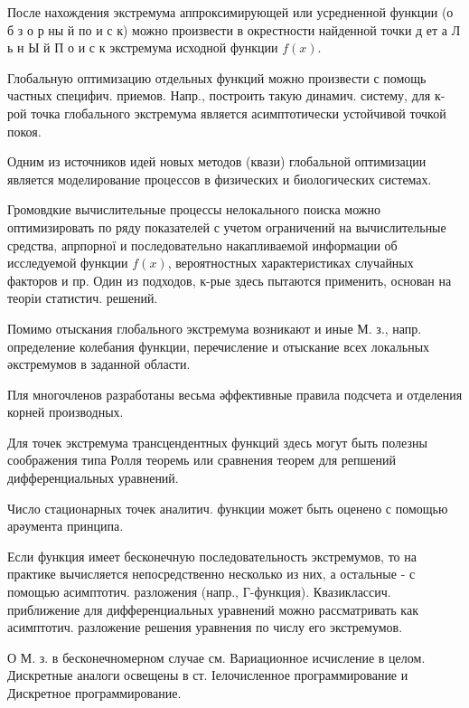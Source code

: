 \documentclass[10pt]{article}
\begin{document}
После нахождения экстремума аппроксимирующей или усредненной функции (о б з о р ны й по и с к) можно произвести в окрестности найденной точки д ет а Л ь н Ы й П о и с к экстремума исходной функции $f(x)$.



Глобальную оптимизацию отдельных функций можно произвести с помощь частных специфич. приемов. Напр., построить такую динамич. систему, для к-рой точка глобального экстремума является асимптотически устойчивой точкой покоя.



Одним из источников идей новых методов (квази) глобальной оптимизации является моделирование процессов в физических и биологических системах.



Громовдкие вычислительные процессы нелокального поиска можно оптимизировать по ряду показателей с учетом ограничений на вычислительные средства, апрпорної и последовательно накапливаемой информации об исследуемой функции $f(x)$, вероятностных характеристиках случайных факторов и пр. Один из подходов, к-рые здесь пытаются применить, основан на теоріи статистич. решений.



Помимо отыскания глобального экстремума возникают и иные М. з., напр. определение колебания функции, перечисление и отыскание всех локальных әкстремумов в заданной области.



Пля многочленов разработаны весьма әффективные правила подсчета и отделения корней производных.



Для точек экстремума трансцендентных функций здесь могут быть полезны соображения типа Ролля теоремь или сравнения теорем для репшений дифференциальных уравнений.



Число стационарных точек аналитич. функции может быть оценено с помощью арәумента принципа.



Если функция имеет бесконечную последовательность экстремумов, то на практике вычисляется непосредственно несколько из них, а остальные - с помощью асимптотич. разложения (напр., Г-функция). Квазиклассич. приближение для дифференциальных уравнений можно рассматривать как асимптотич. разложение решения уравнения по числу его экстремумов.



О М. з. в бесконечномерном случае см. Вариационное исчисление в целом. Дискретные аналоги освещены в ст. Іелочисленное программирование и Дискретное программирование.
\end{document}
